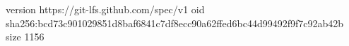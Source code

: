 version https://git-lfs.github.com/spec/v1
oid sha256:bcd73c901029851d8baf6841c7df8ecc90a62ffed6bc44d99492f9f7c92ab42b
size 1156
